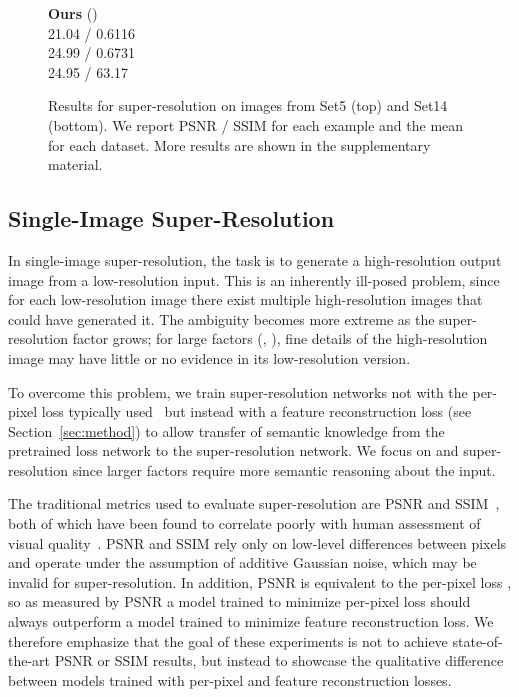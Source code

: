 \documentclass[runningheads]{llncs}
\begin{document}
\begin{figure}[t]
\begin{minipage}{\mywidth}
  \end{minipage}
  \begin{minipage}{\mywidth}
    \centering \textbf{Ours} () \\  21.04 / 0.6116 \\ 24.99 / 0.6731 \\ 24.95 / 63.17
  \end{minipage}
  \vspace{-3mm}
  \caption{Results for  super-resolution on images
    from Set5 (top) and Set14 (bottom). We report PSNR / SSIM for each example
    and the mean for each dataset. More results are shown in the supplementary material.
  }
  \label{fig:SR-4x-results}
  \vspace{-7mm}
\end{figure}

\vspace{-3mm}
\subsection{Single-Image Super-Resolution}
\label{sec:super-res}
In single-image super-resolution, the task is to generate a high-resolution output image from
a low-resolution input. This is an inherently ill-posed problem, since for each low-resolution
image there exist multiple high-resolution images that could have generated it. The ambiguity
becomes more extreme as the super-resolution factor grows; for large factors (, ),
fine details of the high-resolution image may have little or no evidence in its low-resolution version.



To overcome this problem, we train super-resolution networks not with the per-pixel
loss typically used~\cite{dong2015image} but instead with a feature reconstruction
loss (see Section~\ref{sec:method}) to allow transfer of semantic knowledge from
the pretrained loss network to the super-resolution network. We focus on  and 
super-resolution since larger factors require more semantic reasoning about the input.

The traditional metrics used to evaluate super-resolution are PSNR and SSIM~\cite{wang2004image},
both of which have been found to correlate poorly with human assessment of visual
quality~\cite{hanhart2013benchmarking,wang2009mean,huynh2008scope,sheikh2006statistical,kundu2015full}.
PSNR and SSIM rely only on low-level differences between pixels and operate under the
assumption of additive Gaussian noise, which may be invalid for super-resolution. In addition, PSNR
is equivalent to the per-pixel loss , so as measured by PSNR a model trained to minimize
per-pixel loss should always outperform a model trained to minimize feature reconstruction loss.
We therefore emphasize that the goal of these experiments is not to achieve state-of-the-art PSNR or
SSIM results, but instead to showcase the qualitative difference between models trained with per-pixel
and feature reconstruction losses.
\end{document}
